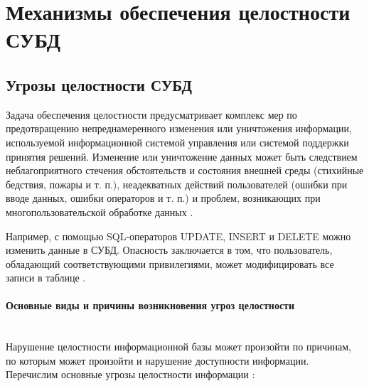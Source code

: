 \section{Механизмы обеспечения целостности СУБД}

\subsection{Угрозы целостности СУБД}
Задача обеспечения целостности предусматривает комплекс мер по предотвращению непреднамеренного изменения или уничтожения информации, используемой информационной системой управления или системой поддержки принятия решений. Изменение или уничтожение данных может быть следствием неблагоприятного стечения обстоятельств и состояния внешней среды (стихийные бедствия, пожары и т. п.), неадекватных действий пользователей (ошибки при вводе данных, ошибки операторов и т. п.) и проблем, возникающих при многопользовательской обработке данных \autocite{Lihonosov2011}.

Например, с помощью SQL-операторов UPDATE, INSERT и DELETE можно изменить данные в СУБД. Опасность заключается в том, что пользователь, обладающий соответствующими привилегиями, может модифицировать все записи в таблице \autocite{Utebov2008}.

\paragraph{Основные виды и причины возникновения угроз целостности} ~\\

Нарушение целостности информационной базы может произойти по причинам, по которым может произойти и нарушение доступности информации.
Перечислим основные угрозы целостности информации \autocite{Pirogov2009}:

